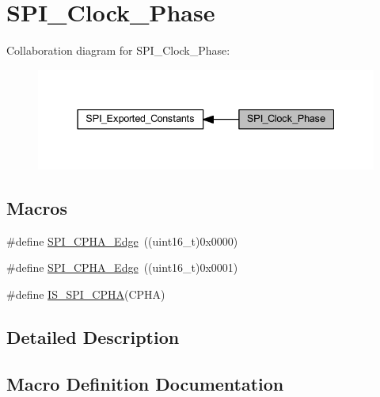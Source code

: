 \hypertarget{group___s_p_i___clock___phase}{}\section{S\+P\+I\+\_\+\+Clock\+\_\+\+Phase}
\label{group___s_p_i___clock___phase}
Collaboration diagram for S\+P\+I\+\_\+\+Clock\+\_\+\+Phase\+:
\nopagebreak
\begin{figure}[H]
\begin{center}
\leavevmode
\includegraphics[width=337pt]{group___s_p_i___clock___phase}
\end{center}
\end{figure}
\subsection*{Macros}
\begin{DoxyCompactItemize}
\item 
\#define \hyperlink{group___s_p_i___clock___phase_gaade9d9555fac8a302bde5c94da9c7292}{S\+P\+I\+\_\+\+C\+P\+H\+A\+\_\+Edge}~((uint16\+\_\+t)0x0000)
\item 
\#define \hyperlink{group___s_p_i___clock___phase_ga7543f88bf05a08705eb4203862dcebdf}{S\+P\+I\+\_\+\+C\+P\+H\+A\+\_\+Edge}~((uint16\+\_\+t)0x0001)
\item 
\#define \hyperlink{group___s_p_i___clock___phase_ga6441f08edf79dd5b243c54b888d3cbf7}{I\+S\+\_\+\+S\+P\+I\+\_\+\+C\+P\+HA}(C\+P\+HA)
\end{DoxyCompactItemize}


\subsection{Detailed Description}


\subsection{Macro Definition Documentation}
\mbox{\label{group___s_p_i___clock___phase_ga6441f08edf79dd5b243c54b888d3cbf7}} 
